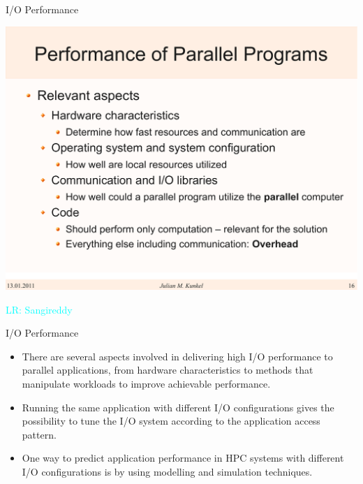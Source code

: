 \documentclass[compress,11pt,xcolor=svgnames,aspectratio=169]{beamer}
\newcommand{\lr}[1]{\textcolor{cyan}{LR: #1}}
\begin{document}
\begin{frame}[t]{I/O Performance}

\begin{center}
\includegraphics[scale=0.3]{fig/performance}
\end{center}

\lr{Sangireddy}

\end{frame}

\begin{frame}[t]{I/O Performance}

\begin{itemize}
\setlength\itemsep{0.6cm}

  \item There are several aspects involved in delivering high I/O performance to parallel applications, from hardware characteristics to methods that manipulate workloads to improve achievable performance.

  \item Running the same application with different I/O configurations gives the possibility to tune the I/O system according to the application access pattern.

  \item One way to predict application performance in HPC systems with different I/O configurations is by using modelling and simulation techniques.

\end{itemize}

\end{frame}
\end{document}
